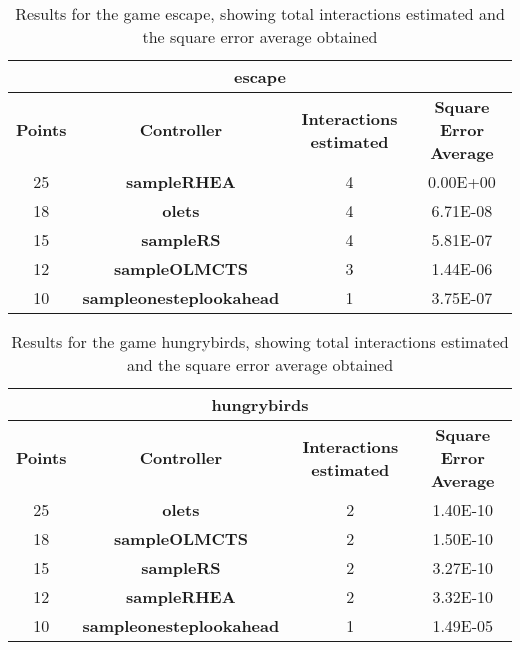 \begin{table*}[!t]
\begin{center}
\begin{adjustbox}{width=1\textwidth}
\begin{tabular}{|c|c|c|c|}
\hline
\multicolumn{4}{|c|}{\textbf{escape}}\\
\hline
\textbf{Points} & \textbf{Controller} & \textbf{Interactions estimated} & \textbf{Square Error Average}\\
\hline
25 & \textbf{sampleRHEA} & 4 & 0.00E+00
 \\
\hline
18 & \textbf{olets} & 4 & 6.71E-08
 \\
\hline
15 & \textbf{sampleRS} & 4 & 5.81E-07
 \\
\hline
12 & \textbf{sampleOLMCTS} & 3 & 1.44E-06
 \\
\hline
10 & \textbf{sampleonesteplookahead} & 1 & 3.75E-07
 \\
\hline
\end{tabular}
\end{adjustbox}
\caption{Results for the game escape, showing total interactions estimated and the square error average obtained}
\label{tab:weights}
\end{center}
\end{table*}
\begin{table*}[!t]
\begin{center}
\begin{adjustbox}{width=1\textwidth}
\begin{tabular}{|c|c|c|c|}
\hline
\multicolumn{4}{|c|}{\textbf{hungrybirds}}\\
\hline
\textbf{Points} & \textbf{Controller} & \textbf{Interactions estimated} & \textbf{Square Error Average}\\
\hline
25 & \textbf{olets} & 2 & 1.40E-10
 \\
\hline
18 & \textbf{sampleOLMCTS} & 2 & 1.50E-10
 \\
\hline
15 & \textbf{sampleRS} & 2 & 3.27E-10
 \\
\hline
12 & \textbf{sampleRHEA} & 2 & 3.32E-10
 \\
\hline
10 & \textbf{sampleonesteplookahead} & 1 & 1.49E-05
 \\
\hline
\end{tabular}
\end{adjustbox}
\caption{Results for the game hungrybirds, showing total interactions estimated and the square error average obtained}
\label{tab:weights}
\end{center}
\end{table*}

